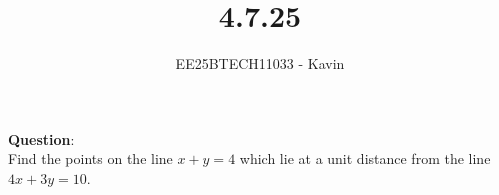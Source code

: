 \documentclass[journal]{IEEEtran}
\begin{document}

\vspace{3cm}

\title{4.7.25}
\author{EE25BTECH11033 - Kavin}
{\let\newpage\relax\maketitle}

\renewcommand{\thefigure}{\theenumi}
\renewcommand{\thetable}{\theenumi}
\setlength{\intextsep}{10pt} %
\textbf{Question}:\\
Find the points on the line $x+y=4$ which lie at a unit distance from the line $4x+3y=10$.\\
\bigskip
\end{document}
